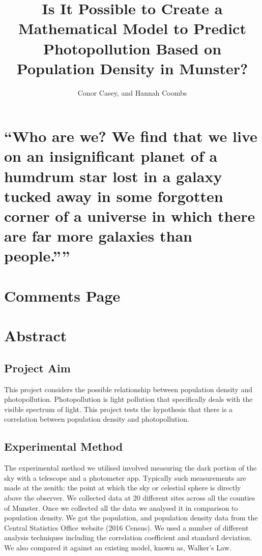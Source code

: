 \documentclass[12pt]{titlepage}
\title{Is It Possible to Create a Mathematical Model to Predict Photopollution Based on Population Density in Munster?}
\author{Conor Casey, and Hannah Coombs}
\begin{document}
\maketitle


\chapter*{
\centering
    ``Who are we? We find that we live on an insignificant planet of a humdrum star
lost in a galaxy tucked away in some forgotten corner of a universe
in which there are far more galaxies than people.”''
\\[5pt]
}

\chapter*{Comments Page}

\chapter*{Abstract}
\section*{Project Aim} 
This project considers the possible relationship between population density and photopollution. Photopollution is light pollution that specifically deals with the visible spectrum of light. This project tests the hypothesis that there is a correlation between population density and photopollution.  

\section*{Experimental Method} 
The experimental method we utilised involved measuring the dark portion of the sky with a telescope and a photometer app. Typically such measurements are made at the zenith: the point at which the sky or celestial sphere is directly above the observer. We collected data at 20 different sites across all the counties of Munster. Once we collected all the data we analysed it in comparison to population density. We got the population, and population density data from the Central Statistics Office website (2016 Census). We used a number of different analysis techniques including the correlation coefficient and standard deviation. We also compared it against an existing model, known as, Walker's Law.  
\end{document}
